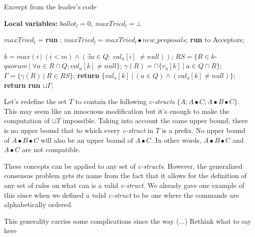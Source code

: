 \begin{algorithm}
	\caption{Excerpt from the leader's code}
	\label{leader_excerpt}
	\textbf{Local variables:} $ballot_l = 0,\ maxTried_l = \bot$
	\begin{algorithmic}[1]
		\State $maxTried_l$ = \textbf{run} ;
		\State $maxTried_l = maxTried_l \bullet new\_proposals$;
		\State \textbf{run}  to Acceptors;
		\EndFunction
		
		\State
		\State $k = max(i\ |\ (i < m) \wedge (\exists a \in Q :\ val_a[i]\ \neq null))$;
		\State $RS = \{R \in k$-$quorum\ |\ \forall a \in R \cap Q : val_a[k] \neq null\}$;
		\State $\gamma(R) = \sqcap \{v_a[k]\ |\ a \in Q \cap R \}$;
		\State $\Gamma = \{\gamma(R)\ |\ R \in RS \}$;
		\State
		\State \textbf{return} $\{val_a[k]\ |\ (a \in Q) \wedge (val_a[k] \neq null)\}$;
		\Else
		\State \textbf{return} \textbf{run} $\sqcup \Gamma$;
		\EndIf
		\EndFunction
		
	\end{algorithmic}
\end{algorithm}
Let's redefine the set $T$ to contain the following \textit{c-structs} $\{A ; A \bullet C ; A \bullet B \bullet C\}$. This may seem like an innocuous modification but it's enough to make the computation of $\sqcup T$ impossible. Taking into account the same upper bound, there is no upper bound that to which every \textit{c-struct} in $T$ is a prefix. No upper bound of $A \bullet B \bullet C$ will also be an upper bound of $A \bullet C$. In other words, $A \bullet B \bullet C$ and $A \bullet C$ are not compatible.\par 
These concepts can be applied to any set of \textit{c-structs}. However, the generalized consensus problem gets its name from the fact that it allows for the definition of any set of rules on what can is a valid \textit{c-struct}. We already gave one example of this since when we defined a valid \textit{c-struct} to be one where the commands are alphabetically ordered.\par 
{\color{red} This generality carries some complications since the way (...) Rethink what to say here}

